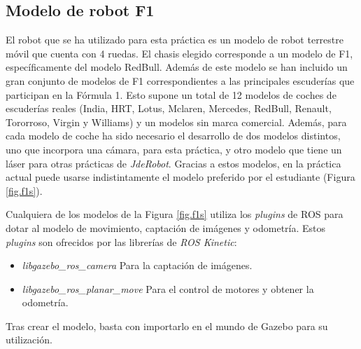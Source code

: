 
\subsection{Modelo de robot F1}
El robot que se ha utilizado para esta práctica es un modelo de robot terrestre móvil que cuenta con 4 ruedas. El chasis elegido corresponde a un modelo de F1, específicamente del modelo RedBull. Además de este modelo se han incluido un gran conjunto de modelos de F1 correspondientes a las principales escuderías que participan en la Fórmula 1. Esto supone un total de 12 modelos de coches de escuderías reales (India, HRT, Lotus, Mclaren, Mercedes, RedBull, Renault, Tororroso, Virgin y Williams) y un modelos sin marca comercial. Además, para cada modelo de coche ha sido necesario el desarrollo de dos modelos distintos, uno que incorpora una cámara, para esta práctica, y otro modelo que tiene un láser para otras prácticas de \textit{JdeRobot}. Gracias a estos modelos, en la práctica actual puede usarse indistintamente el modelo preferido por el estudiante (Figura \ref{fig.f1s}).


Cualquiera de los modelos de la Figura \ref{fig.f1s} utiliza los \textit{plugins} de ROS para dotar al modelo de movimiento, captación de imágenes y odometría. Estos \textit{plugins} son ofrecidos por las librerías de \textit{ROS Kinetic}:

\begin{itemize}
	\item \textit{libgazebo\_ros\_camera}
Para la captación de imágenes.
	\item \textit{libgazebo\_ros\_planar\_move}
Para el control de motores y obtener la odometría.
\end{itemize}

Tras crear el modelo, basta con importarlo en el mundo de Gazebo para su utilización.

